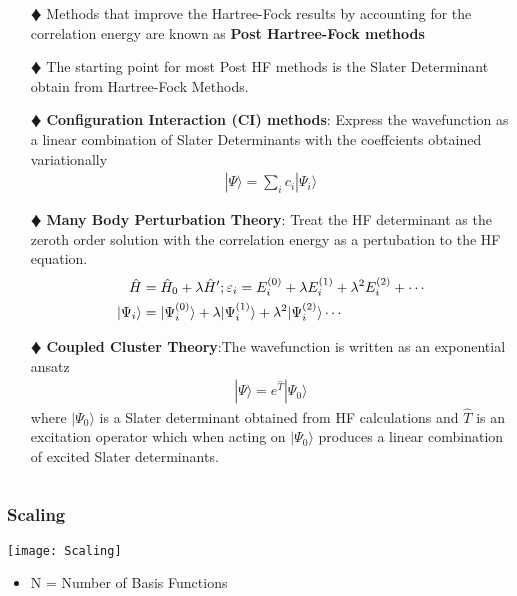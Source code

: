\documentclass[slidestop,mathserif,compress,xcolor=svgnames]{beamer}
\begin{document}
\begin{frame}
\scriptsize{
\begin{columns}
\column{12cm}
\vspace{-0.5cm}
\begin{block}{}
\begin{itemize}
\item[$\vardiamond$]Methods that improve the Hartree-Fock results by accounting for the correlation energy are known as {\bf Post Hartree-Fock methods}
\item[$\vardiamond$]The starting point for most Post HF methods is the Slater Determinant obtain from Hartree-Fock Methods.
\item[$\vardiamond$]{\bf Configuration Interaction (CI) methods}: Express the wavefunction as a linear combination of Slater Determinants with the coeffcients obtained variationally
\begin{align*}
|\Psi\rangle = \sum_ic_i|\Psi_i\rangle
\end{align*}
\item[$\vardiamond$]{\bf Many Body Perturbation Theory}: Treat the HF determinant as the zeroth order solution with the correlation energy as a pertubation to the HF equation.
\begin{align*}
\hat{H} &= \hat{H}_0 + \lambda\hat{H}^\prime\vspace{0.5cm};\vspace{0.5cm}
\varepsilon_i = E^{(0)}_i + \lambda E^{(1)}_i + \lambda^2E^{(2)}_i + \cdots\\
|\Psi_i\rangle &= |\Psi^{(0)}_i\rangle + \lambda|\Psi^{(1)}_i\rangle + \lambda^2|\Psi^{(2)}_i\rangle\cdots
\end{align*}
\item[$\vardiamond$]{\bf Coupled Cluster Theory}:The wavefunction is written as an exponential ansatz
\begin{align*}
|\Psi\rangle = e^{\hat{T}}|\Psi_0\rangle
\end{align*}
where $|\Psi_0\rangle$ is a Slater determinant obtained from HF calculations and $\hat{T}$ is an excitation operator which when acting on $|\Psi_0\rangle$ produces a linear combination of excited Slater determinants.
\end{itemize}
\end{block}
\end{columns}
}
\end{frame}

\begin{frame}
\frametitle{\small Scaling}
\begin{center}
\vspace{-1cm}
\texttt{[image: Scaling]}%
\end{center}
\vspace{-1cm}
\begin{itemize}
\item N = Number of Basis Functions
\end{itemize}
\end{frame}
\end{document}
